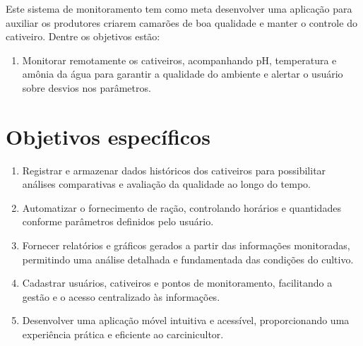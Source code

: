 Este sistema de monitoramento tem como meta desenvolver uma aplicação para auxiliar os produtores criarem camarões de boa qualidade e manter o controle do cativeiro. Dentre os objetivos estão:

\begin{enumerate}

\item Monitorar remotamente os cativeiros, acompanhando pH, temperatura e amônia da água para garantir a qualidade do ambiente e alertar o usuário sobre desvios nos parâmetros.

\end{enumerate}

\section*{Objetivos específicos}

\begin{enumerate}
    \item Registrar e armazenar dados históricos dos cativeiros para possibilitar análises comparativas e avaliação da qualidade ao longo do tempo.

    \item Automatizar o fornecimento de ração, controlando horários e quantidades conforme parâmetros definidos pelo usuário.

    \item Fornecer relatórios e gráficos gerados a partir das informações monitoradas, permitindo uma análise detalhada e fundamentada das condições do cultivo.
    
    \item Cadastrar usuários, cativeiros e pontos de monitoramento, facilitando a gestão e o acesso centralizado às informações.
    
    \item Desenvolver uma aplicação móvel intuitiva e acessível, proporcionando uma experiência prática e eficiente ao carcinicultor.

\end{enumerate}